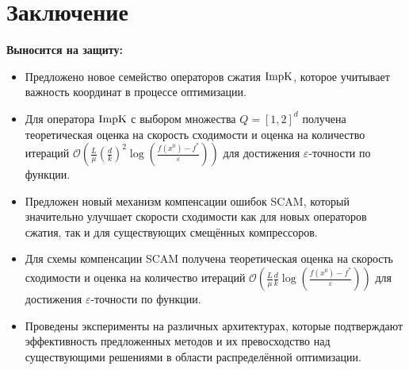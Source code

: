 \section{Заключение}
\textbf{Выносится на защиту:}
\begin{itemize}
    \item Предложено новое семейство операторов сжатия $\operatorname{ImpK}$, которое учитывает важность координат в процессе оптимизации.
    \item Для оператора $\operatorname{ImpK}$ с выбором множества $Q = [1, 2]^d$ получена теоретическая оценка на скорость сходимости и оценка на количество итераций $\mathcal{O}\left(\frac{L}{\mu} \left(\frac{d}{k}\right)^2 \log\left(\frac{f(x^0) - f^*}{\varepsilon}\right)\right)$ для достижения $\varepsilon$-точности по функции.
    \item Предложен новый механизм компенсации ошибок SCAM, который значительно улучшает скорости сходимости как для новых операторов сжатия, так и для существующих смещённых компрессоров.
    \item Для схемы компенсации SCAM получена теоретическая оценка на скорость сходимости и оценка на количество итераций $\mathcal{O}\left(\frac{L}{\mu} \frac{d}{k} \log\left(\frac{f(x^0) - f^*}{\varepsilon}\right)\right)$ для достижения $\varepsilon$-точности по функции.
    \item Проведены эксперименты на различных архитектурах, которые подтверждают эффективность предложенных методов и их превосходство над существующими решениями в области распределённой оптимизации.
\end{itemize}